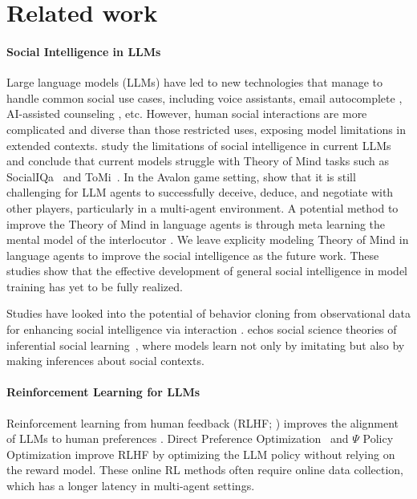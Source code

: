 \section{Related work}
\paragraph{Social Intelligence in LLMs}

Large language models (LLMs) have led to new technologies that manage to handle common social use cases, including voice assistants, email autocomplete \citep{gmail}, AI-assisted counseling \citep{aicounseling}, etc.
However, human social interactions are more complicated and diverse than those restricted uses,
exposing model limitations in extended contexts. \citet{sap2023neural} study the limitations of social intelligence in current LLMs and conclude that current models struggle with Theory of Mind tasks such as SocialIQa~\citep{sap-etal-2019-social} and ToMi~\citep{le-etal-2019-revisiting}. In the Avalon game setting, 
\citet{light2023text} show that it is still challenging for LLM agents to successfully deceive, deduce, and negotiate with other players, particularly in a multi-agent environment. A potential method to improve the Theory of Mind in language agents is through meta learning the mental model of the interlocutor \citep{zhu2021few,zhu2022language,liu2022computational}. We leave explicity modeling Theory of Mind in language agents to improve the social intelligence as the future work. These studies show that the effective development of general social intelligence in model training has yet to be fully realized.


Studies have looked into the potential of behavior cloning from observational data for enhancing social intelligence via interaction 
\citep{wang2023aligning}. 
\model echos social science theories of inferential social learning~\citep{inferential-social-learning}, where models learn not only by imitating but also by making inferences about social contexts.


\paragraph{Reinforcement Learning for LLMs}
\label{sec:rl_llm}
Reinforcement learning from human feedback (RLHF; \citet{christiano2017deep}) improves the alignment of LLMs to human preferences \citep{ouyang2022training}. Direct Preference Optimization~\cite{dpo} and $\Psi$ Policy Optimization \cite{ipo} improve RLHF by optimizing the LLM policy without relying on the reward model. These online RL methods often require online data collection, which has a longer latency in multi-agent settings. 


